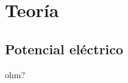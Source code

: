 \documentclass[11pt,a4paper,twoside]{tesis}
\begin{document}
%
%


\chapter{Teoría}

\section{Potencial eléctrico}

ohm?\\
\end{document}
